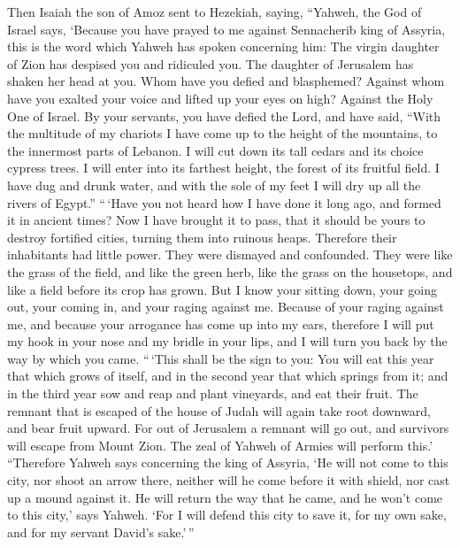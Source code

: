  Then Isaiah the son of Amoz sent to Hezekiah, saying,
``Yahweh, the God of Israel says, `Because you have prayed to me against
Sennacherib king of Assyria,  this is the word which
Yahweh has spoken concerning him: The virgin daughter of Zion has
despised you and ridiculed you. The daughter of Jerusalem has shaken her
head at you.  Whom have you defied and blasphemed?
Against whom have you exalted your voice and lifted up your eyes on
high? Against the Holy One of Israel.  By your servants,
you have defied the Lord, and have said, ``With the multitude of my
chariots I have come up to the height of the mountains, to the innermost
parts of Lebanon. I will cut down its tall cedars and its choice cypress
trees. I will enter into its farthest height, the forest of its fruitful
field.  I have dug and drunk water, and with the sole of
my feet I will dry up all the rivers of Egypt.'' 
``\,`Have you not heard how I have done it long ago, and formed it in
ancient times? Now I have brought it to pass, that it should be yours to
destroy fortified cities, turning them into ruinous heaps.
 Therefore their inhabitants had little power. They were
dismayed and confounded. They were like the grass of the field, and like
the green herb, like the grass on the housetops, and like a field before
its crop has grown.  But I know your sitting down, your
going out, your coming in, and your raging against me. 
Because of your raging against me, and because your arrogance has come
up into my ears, therefore I will put my hook in your nose and my bridle
in your lips, and I will turn you back by the way by which you came.
 ``\,`This shall be the sign to you: You will eat this
year that which grows of itself, and in the second year that which
springs from it; and in the third year sow and reap and plant vineyards,
and eat their fruit.  The remnant that is escaped of the
house of Judah will again take root downward, and bear fruit upward.
 For out of Jerusalem a remnant will go out, and
survivors will escape from Mount Zion. The zeal of Yahweh of Armies will
perform this.'  ``Therefore Yahweh says concerning the
king of Assyria, `He will not come to this city, nor shoot an arrow
there, neither will he come before it with shield, nor cast up a mound
against it.  He will return the way that he came, and he
won't come to this city,' says Yahweh.  `For I will
defend this city to save it, for my own sake, and for my servant David's
sake.'\,''

